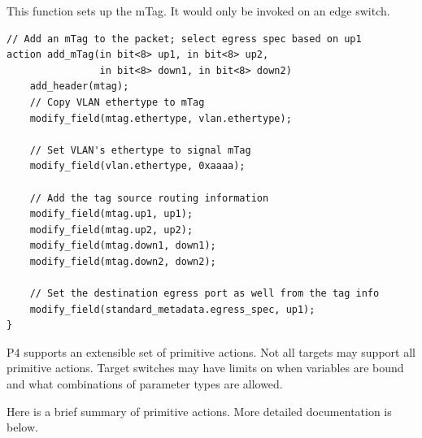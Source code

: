\documentclass[12pt]{article}
\begin{document}
This function sets up the mTag. It would only be invoked on an edge switch.

\begin{lstlisting}[style=P4style]
// Add an mTag to the packet; select egress spec based on up1
action add_mTag(in bit<8> up1, in bit<8> up2,
                in bit<8> down1, in bit<8> down2)
    add_header(mtag);
    // Copy VLAN ethertype to mTag
    modify_field(mtag.ethertype, vlan.ethertype);

    // Set VLAN's ethertype to signal mTag
    modify_field(vlan.ethertype, 0xaaaa);

    // Add the tag source routing information
    modify_field(mtag.up1, up1);
    modify_field(mtag.up2, up2);
    modify_field(mtag.down1, down1);
    modify_field(mtag.down2, down2);

    // Set the destination egress port as well from the tag info
    modify_field(standard_metadata.egress_spec, up1);
}
\end{lstlisting}


P4 supports an extensible set of primitive actions. Not all targets 
may support all primitive actions. Target switches may have
limits on when variables are bound and what combinations of parameter
types are allowed.

Here is a brief summary of primitive actions. More detailed documentation 
is below.
\end{document}

